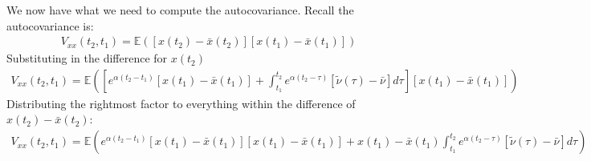 \documentclass{article}
\begin{document}
\begin{comment}
Substituting into the autocovariance:
\begin{align*}
V_{xx}(t_2,t_1) = \mathbb{E}([e^{\alpha (t_2-t_1)}[x(t_1) - \bar{x}(t_1)] +  \int_{t_1}^{t_2} e^{\alpha (t_2-\tau)} [\tilde{\nu}(\tau) - \bar{\nu}] d\tau] \\
[e^{\alpha (t_1-t_0)}[x(t_0) - \bar{x}(t_0)] + \int_{t_0}^{t_1} e^{\alpha (t_1-\tau)} [\tilde{\nu}(\tau) - \bar{\nu}] d\tau])
\end{align*}
Expanding this product out:

\begin{align*}
V_{xx}(t_2,t_1) = \mathbb{E}(e^{\alpha (t_2-t_1)}[x(t_1) - \bar{x}(t_1)] \int_{t_0}^{t_1} e^{\alpha (t_1-\tau)} [\tilde{\nu}(\tau) - \bar{\nu}] d\tau]) + \\
\mathbb{E}(\int_{t_1}^{t_2} e^{\alpha (t_2-\tau)} [\tilde{\nu}(\tau) - \bar{\nu}] d\tau] \int_{t_0}^{t_1} e^{\alpha (t_1-\tau)} [\tilde{\nu}(\tau) - \bar{\nu}] d\tau]) + \\
\mathbb{E}([e^{\alpha (t_2-t_1)}[x(t_1) - \bar{x}(t_1)][e^{\alpha (t_1-t_0)}[x(t_0) - \bar{x}(t_0)]) + \\
\mathbb{E}([e^{\alpha (t_1-t_0)}[x(t_0) - \bar{x}(t_0)] \int_{t_1}^{t_2} e^{\alpha (t_2-\tau)} [\tilde{\nu}(\tau) - \bar{\nu}] d\tau])
\end{align*}

\begin{align*}
V_{xx}(t_2,t_1) = xt + \\
ty + \\
xz + \\
yz
\end{align*}
\end{comment}
We now have what we need to compute the autocovariance. Recall the autocovariance is:
\begin{align*}
V_{xx}(t_2,t_1) = \mathbb{E}([x(t_2)-\bar{x}(t_2)][x(t_1)-\bar{x}(t_1)])
\end{align*}
Substituting in the difference for $x(t_2)$
\begin{align*}
V_{xx}(t_2,t_1) = \mathbb{E}([e^{\alpha (t_2-t_1)}[x(t_1) - \bar{x}(t_1)] +  \int_{t_1}^{t_2} e^{\alpha (t_2-\tau)} [\tilde{\nu}(\tau) - \bar{\nu}] d\tau][x(t_1)-\bar{x}(t_1)])
\end{align*}
Distributing the rightmost factor to everything within the difference of $x(t_2)-\bar{x}(t_2)$:
\begin{align*}
V_{xx}(t_2,t_1) = \mathbb{E}(e^{\alpha (t_2-t_1)}[x(t_1) - \bar{x}(t_1)][x(t_1)-\bar{x}(t_1)] +  x(t_1)-\bar{x}(t_1)\int_{t_1}^{t_2} e^{\alpha (t_2-\tau)} [\tilde{\nu}(\tau) - \bar{\nu}] d\tau)
\end{align*}
\end{document}
